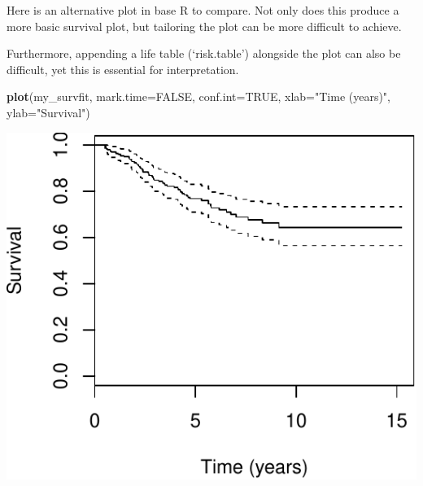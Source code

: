 \documentclass[12pt,]{krantz}
\makeatletter
\newenvironment{Shaded}{\begin{snugshade}}{\end{snugshade}}
\newcommand{\CommentTok}[1]{\textcolor[rgb]{0.56,0.35,0.01}{\textit{#1}}}
\newcommand{\DataTypeTok}[1]{\textcolor[rgb]{0.13,0.29,0.53}{#1}}
\newcommand{\DecValTok}[1]{\textcolor[rgb]{0.00,0.00,0.81}{#1}}
\newcommand{\FloatTok}[1]{\textcolor[rgb]{0.00,0.00,0.81}{#1}}
\newcommand{\KeywordTok}[1]{\textcolor[rgb]{0.13,0.29,0.53}{\textbf{#1}}}
\newcommand{\NormalTok}[1]{#1}
\newcommand{\OperatorTok}[1]{\textcolor[rgb]{0.81,0.36,0.00}{\textbf{#1}}}
\newcommand{\OtherTok}[1]{\textcolor[rgb]{0.56,0.35,0.01}{#1}}
\newcommand{\StringTok}[1]{\textcolor[rgb]{0.31,0.60,0.02}{#1}}
\newenvironment{kframe}{%
\medskip{}
\setlength{\fboxsep}{.8em}
 \def\at@end@of@kframe{}%
 \ifinner\ifhmode%
  \def\at@end@of@kframe{\end{minipage}}%
  \begin{minipage}{\columnwidth}%
 \fi\fi%
 \def\FrameCommand##1{\hskip\@totalleftmargin \hskip-\fboxsep
 \colorbox{shadecolor}{##1}\hskip-\fboxsep
     \hskip-\linewidth \hskip-\@totalleftmargin \hskip\columnwidth}%
 \MakeFramed {\advance\hsize-\width
   \@totalleftmargin\z@ \linewidth\hsize
   \@setminipage}}%
 {\par\unskip\endMakeFramed%
 \at@end@of@kframe}
\renewenvironment{Shaded}{\begin{kframe}}{\end{kframe}}
\theoremstyle{definition}
\theoremstyle{definition}
\theoremstyle{definition}
\theoremstyle{remark}
\makeatother
\begin{document}
\begin{Shaded}
\end{Shaded}

Here is an alternative plot in base R to compare. Not only does this
produce a more basic survival plot, but tailoring the plot can be more
difficult to achieve.

Furthermore, appending a life table (`risk.table') alongside the plot
can also be difficult, yet this is essential for interpretation.

\begin{Shaded}
\begin{Highlighting}[]
\KeywordTok{plot}\NormalTok{(my_survfit, }\DataTypeTok{mark.time=}\OtherTok{FALSE}\NormalTok{, }\DataTypeTok{conf.int=}\OtherTok{TRUE}\NormalTok{, }
         \DataTypeTok{xlab=}\StringTok{"Time (years)"}\NormalTok{, }\DataTypeTok{ylab=}\StringTok{"Survival"}\NormalTok{)}
\end{Highlighting}
\end{Shaded}

\includegraphics{10_survival_files/figure-latex/unnamed-chunk-7-1.pdf}
\end{document}
